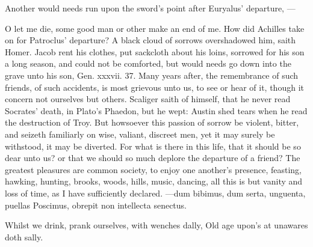 {Another would needs run upon the sword's point after Euryalus'
departure,
---

O let me die, some good man or other make an end of me. How did
Achilles take on for Patroclus' departure? A black cloud of sorrows
overshadowed him, saith Homer. Jacob rent his clothes, put sackcloth
about his loins, sorrowed for his son a long season, and could not be
comforted, but would needs go down into the grave unto his son, Gen.
xxxvii. 37. Many years after, the remembrance of such friends, of such
accidents, is most grievous unto us, to see or hear of it, though it
concern not ourselves but others. Scaliger saith of himself, that he
never read Socrates' death, in Plato's Phaedon, but he wept:
Austin shed tears when he read the destruction of Troy. But
howsoever this passion of sorrow be violent, bitter, and seizeth
familiarly on wise, valiant, discreet men, yet it may surely be
withstood, it may be diverted. For what is there in this life, that it
should be so dear unto us? or that we should so much deplore the
departure of a friend? The greatest pleasures are common society, to
enjoy one another's presence, feasting, hawking, hunting, brooks,
woods, hills, music, dancing, \etc{} all this is but vanity and loss of
time, as I have sufficiently declared.
---dum bibimus, dum serta, unguenta, puellas
Poscimus, obrepit non intellecta senectus.

Whilst we drink, prank ourselves, with wenches dally,
Old age upon's at unawares doth sally.

}
